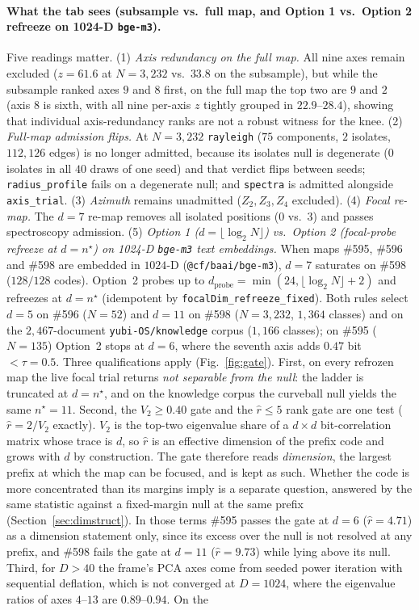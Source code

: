 \documentclass[11pt,a4paper]{article}
\theoremstyle{plain}
\theoremstyle{remark}
\begin{document}
\paragraph{What the tab sees (subsample vs.\ full map, and Option 1 vs.\ Option 2 refreeze on 1024-D \texttt{bge-m3}).} Five readings matter. (1) \emph{Axis redundancy on the full map.} All nine axes remain excluded ($z=61.6$ at $N=3{,}232$ vs.\ $33.8$ on the subsample), but while the subsample ranked axes $9$ and $8$ first, on the full map the top two are $9$ and $2$ (axis $8$ is sixth, with all nine per-axis $z$ tightly grouped in $22.9$--$28.4$), showing that individual axis-redundancy ranks are not a robust witness for the knee. (2) \emph{Full-map admission flips.} At $N=3{,}232$ \texttt{rayleigh} ($75$ components, $2$ isolates, $112{,}126$ edges) is no longer admitted, because its isolates null is degenerate ($0$ isolates in all $40$ draws of one seed) and that verdict flips between seeds; \texttt{radius\_profile} fails on a degenerate null; and \texttt{spectra} is admitted alongside \texttt{axis\_trial}. (3) \emph{Azimuth} remains unadmitted ($Z_2,Z_3,Z_4$ excluded). (4) \emph{Focal re-map.} The $d=7$ re-map removes all isolated positions ($0$ vs.\ $3$) and passes spectroscopy admission. (5) \emph{Option 1 ($d=\lfloor\log_2 N\rfloor$) vs.\ Option 2 (focal-probe refreeze at $d=n^\star$) on 1024-D \texttt{bge-m3} text embeddings.} When maps \#595, \#596 and \#598 are embedded in $1024$-D (\texttt{@cf/baai/bge-m3}), $d=7$ saturates on \#598 ($128/128$ codes). Option~2 probes up to $d_{\mathrm{probe}}=\min(24,\lfloor\log_2 N\rfloor+2)$ and refreezes at $d=n^\star$ (idempotent by \texttt{focalDim\_refreeze\_fixed}). Both rules select $d=5$ on \#596 ($N=52$) and $d=11$ on \#598 ($N=3{,}232$, $1{,}364$ classes) and on the $2{,}467$-document \texttt{yubi-OS/knowledge} corpus ($1{,}166$ classes); on \#595 ($N=135$) Option~2 stops at $d=6$, where the seventh axis adds $0.47$ bit $<\tau=0.5$. Three qualifications apply (Fig.~\ref{fig:gate}). First, on every refrozen map the live focal trial returns \emph{not separable from the null}: the ladder is truncated at $d=n^\star$, and on the knowledge corpus the curveball null yields the same $n^\star=11$. Second, the $V_2\ge0.40$ gate and the $\hat r\le5$ rank gate are one test ($\hat r=2/V_2$ exactly). $V_2$ is the top-two eigenvalue share of a $d\times d$ bit-correlation matrix whose trace is $d$, so $\hat r$ is an effective dimension of the prefix code and grows with $d$ by construction. The gate therefore reads \emph{dimension}, the largest prefix at which the map can be focused, and is kept as such. Whether the code is more concentrated than its margins imply is a separate question, answered by the same statistic against a fixed-margin null at the same prefix (Section~\ref{sec:dimstruct}). In those terms \#595 passes the gate at $d=6$ ($\hat r=4.71$) as a dimension statement only, since its excess over the null is not resolved at any prefix, and \#598 fails the gate at $d=11$ ($\hat r=9.73$) while lying above its null. Third, for $D>40$ the frame's PCA axes come from seeded power iteration with sequential deflation, which is not converged at $D=1024$, where the eigenvalue ratios of axes $4$--$13$ are $0.89$--$0.94$. On the 
\end{document}
